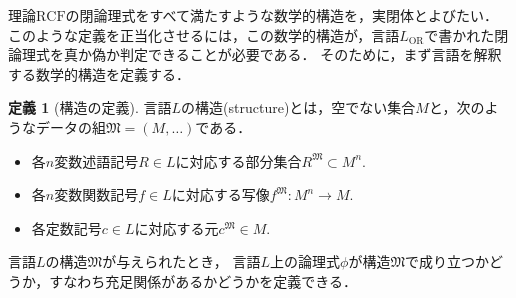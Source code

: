 \documentclass[uplatex, dvipdfmx]{jsarticle}
\newcommand{\M}{\mathfrak{M}}
\newcommand{\RCF}{\mathrm{RCF}}
\newcommand{\map}[3]{{#1}:{#2}\rightarrow{#3}}
\theoremstyle{definition}
\newtheorem{definition}{定義}[section]
\begin{document}
理論$\RCF$の閉論理式をすべて満たすような数学的構造を，実閉体とよびたい．
このような定義を正当化させるには，この数学的構造が，言語$L_\mathrm{OR}$で書かれた閉論理式を真か偽か判定できることが必要である．
そのために，まず言語を解釈する数学的構造を定義する．

\begin{definition}[構造の定義]
     言語$L$の構造(structure)とは，空でない集合$M$と，次のようなデータの組$\M=(M,\dots)$である．
     \begin{itemize}
          \item 各$n$変数述語記号$R \in L$に対応する部分集合$R^\M \subset M^n$.
          \item 各$n$変数関数記号$f \in L$に対応する写像$\map{f^\M}{M^n}{M}$.
          \item 各定数記号$c \in L$に対応する元$c^\M \in M$.
     \end{itemize}
\end{definition}

言語$L$の構造$\M$が与えられたとき，
言語$L$上の論理式$\phi$が構造$\M$で成り立つかどうか，すなわち充足関係があるかどうかを定義できる．
\end{document}
